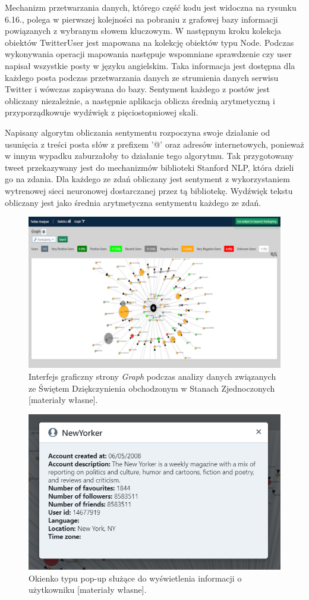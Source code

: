 Mechanizm przetwarzania danych, którego część kodu jest widoczna na rysunku 6.16., polega w pierwszej kolejności na pobraniu z grafowej bazy informacji powiązanych z wybranym słowem kluczowym. W następnym kroku kolekcja obiektów TwitterUser jest mapowana na kolekcję obiektów typu Node. Podczas wykonywania operacji mapowania następuje wspomniane sprawdzenie czy user napisał wszystkie posty w języku angielskim. Taka informacja jest dostępna dla każdego posta podczas przetwarzania danych ze strumienia danych serwisu Twitter i wówczas zapisywana do bazy. Sentyment każdego z postów jest obliczany niezależnie, a następnie aplikacja oblicza średnią arytmetyczną i przyporządkowuje wydźwięk z pięciostopniowej skali.

Napisany algorytm obliczania sentymentu rozpoczyna swoje działanie od usunięcia z treści posta słów z prefixem '@' oraz adresów internetowych, ponieważ w innym wypadku zaburzałoby to działanie tego algorytmu. Tak przygotowany tweet przekazywany jest do mechanizmów biblioteki Stanford NLP, która dzieli go na zdania. Dla każdego ze zdań obliczany jest sentyment z wykorzystaniem wytrenowej sieci neuronowej dostarczanej przez tą bibliotekę. Wydźwięk tekstu obliczany jest jako średnia arytmetyczna sentymentu każdego ze zdań.

\begin{figure}[h] %
	\centering
	\includegraphics[width=1.0\linewidth]{img/twitter_analyser_thanks_giving_1}
	\caption{Interfejs graficzny strony \textit{Graph} podczas analizy danych związanych ze Świętem Dziękczynienia obchodzonym w Stanach Zjednoczonych [materiały własne].}
\end{figure}

\begin{figure}[h] %
	\centering
	\includegraphics[width=0.6\linewidth]{img/twitter_analyser_user_profile}
	\caption{Okienko typu pop-up służące do wyświetlenia informacji o użytkowniku [materiały własne].}
\end{figure}

